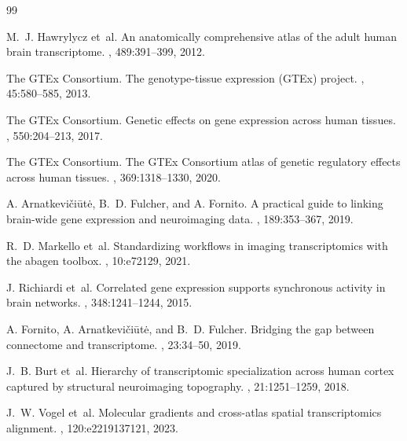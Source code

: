 \documentclass[11pt]{article}
\numberwithin{equation}{section}
\begin{document}
\begin{thebibliography}{99}

M.~J. Hawrylycz et~al.
\newblock An anatomically comprehensive atlas of the adult human brain transcriptome.
, 489:391--399, 2012.

The GTEx Consortium.
\newblock The genotype-tissue expression (GTEx) project.
, 45:580--585, 2013.

The GTEx Consortium.
\newblock Genetic effects on gene expression across human tissues.
, 550:204--213, 2017.

The GTEx Consortium.
\newblock The GTEx Consortium atlas of genetic regulatory effects across human tissues.
, 369:1318--1330, 2020.

A. Arnatkevi{\v{c}}i{\={u}}t{\.{e}}, B.~D. Fulcher, and A. Fornito.
\newblock A practical guide to linking brain-wide gene expression and neuroimaging data.
, 189:353--367, 2019.

R.~D. Markello et~al.
\newblock Standardizing workflows in imaging transcriptomics with the abagen toolbox.
, 10:e72129, 2021.

J. Richiardi et~al.
\newblock Correlated gene expression supports synchronous activity in brain networks.
, 348:1241--1244, 2015.

A. Fornito, A. Arnatkevi{\v{c}}i{\={u}}t{\.{e}}, and B.~D. Fulcher.
\newblock Bridging the gap between connectome and transcriptome.
, 23:34--50, 2019.

J.~B. Burt et~al.
\newblock Hierarchy of transcriptomic specialization across human cortex captured by
structural neuroimaging topography.
, 21:1251--1259, 2018.

J.~W. Vogel et~al.
\newblock Molecular gradients and cross-atlas spatial transcriptomics alignment.
,
120:e2219137121, 2023.


\end{thebibliography}
\end{document}
